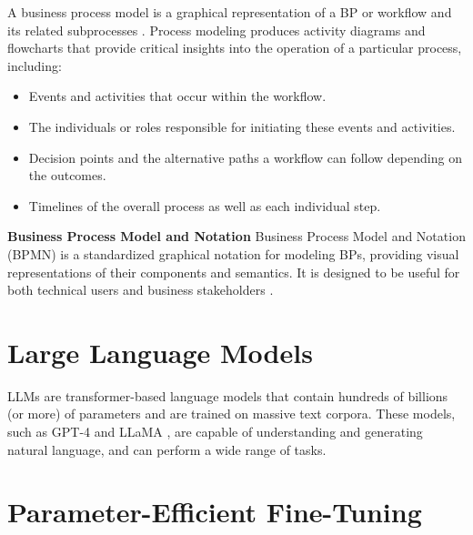 \documentclass[%
    paper=A4,                    %
    twoside=true,               %
    openright,                  %
    parskip=full,               %
    chapterprefix=true,         %
    11pt,                       %
    headings=normal,            %
    bibliography=totoc,         %
    listof=totoc,              %
    titlepage=on,              %
    captions=tableabove,        %
    draft=false,               %
]{scrreprt}%
\begin{document}
A business process model is a graphical representation of a BP or workflow and its related subprocesses \cite{hammer2014business}. Process modeling produces activity diagrams and flowcharts that provide critical insights into the operation of a particular process, including:
\begin{itemize}
	\item Events and activities that occur within the workflow.
	\item The individuals or roles responsible for initiating these events and activities.
	\item Decision points and the alternative paths a workflow can follow depending on the outcomes.
	\item Timelines of the overall process as well as each individual step.
\end{itemize}



\textbf{Business Process Model and Notation}\hspace{0.5em}
Business Process Model and Notation (BPMN) is a standardized graphical notation for modeling BPs, providing visual representations of their components and semantics. It is designed to be useful for both technical users and business stakeholders \cite{omg2013bpmn}.




\section{Large Language Models }
LLMs are transformer-based language models that contain hundreds of billions (or more) of parameters and are trained on massive text corpora. These models, such as GPT-4 \cite{achiam2023gpt} and LLaMA \cite{touvron2023llama}, are capable of understanding and generating natural language, and can perform a wide range of tasks.

\section{Parameter-Efficient Fine-Tuning}
\end{document}
